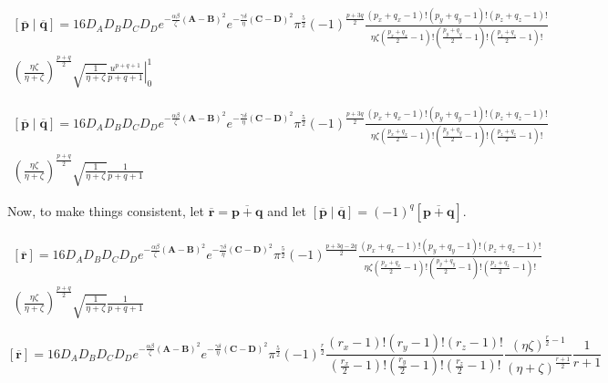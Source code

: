 \begin{multline}
  \left[\overline{\mathbf{p}}\middle|\overline{\mathbf{q}}\right] = 16D_AD_BD_CD_D e^{-\frac{\alpha\beta}{\zeta}\left(\mathbf{A} - \mathbf{B}\right)^2}e^{-\frac{\gamma\delta}{\eta}\left(\mathbf{C} - \mathbf{D}\right)^2}\pi^{\frac{5}{2}}(-1)^{\frac{p + 3q}{2}}\frac{(p_x + q_x - 1)!(p_y + q_y - 1)!(p_z + q_z - 1)!}{\eta\zeta\left(\frac{p_x + q_x}{2} - 1\right)!\left(\frac{p_y + q_y}{2} - 1\right)!\left(\frac{p_z + q_z}{2} - 1\right)!}\\
  \left(\frac{\eta\zeta}{\eta + \zeta}\right)^{\frac{p + q}{2}}\sqrt{\frac{1}{\eta + \zeta}}\left.\frac{u^{p + q + 1}}{p + q + 1}\right|_0^1
\end{multline}

\begin{multline}
  \left[\overline{\mathbf{p}}\middle|\overline{\mathbf{q}}\right] = 16D_AD_BD_CD_D e^{-\frac{\alpha\beta}{\zeta}\left(\mathbf{A} - \mathbf{B}\right)^2}e^{-\frac{\gamma\delta}{\eta}\left(\mathbf{C} - \mathbf{D}\right)^2}\pi^{\frac{5}{2}}(-1)^{\frac{p + 3q}{2}}\frac{(p_x + q_x - 1)!(p_y + q_y - 1)!(p_z + q_z - 1)!}{\eta\zeta\left(\frac{p_x + q_x}{2} - 1\right)!\left(\frac{p_y + q_y}{2} - 1\right)!\left(\frac{p_z + q_z}{2} - 1\right)!}\\
  \left(\frac{\eta\zeta}{\eta + \zeta}\right)^{\frac{p + q}{2}}\sqrt{\frac{1}{\eta + \zeta}}\frac{1}{p + q + 1}
\end{multline}

Now, to make things consistent, let $\overline{\mathbf{r}} = \overline{\mathbf{p} + \mathbf{q}}$ and let $\left[\overline{\mathbf{p}}\middle|\overline{\mathbf{q}}\right] = (-1)^q\left[\overline{\mathbf{p} + \mathbf{q}}\right]$. 

\begin{multline}
  \left[\overline{\mathbf{r}}\right] = 16D_AD_BD_CD_D e^{-\frac{\alpha\beta}{\zeta}\left(\mathbf{A} - \mathbf{B}\right)^2}e^{-\frac{\gamma\delta}{\eta}\left(\mathbf{C} - \mathbf{D}\right)^2}\pi^{\frac{5}{2}}(-1)^{\frac{p + 3q - 2q}{2}}\frac{(p_x + q_x - 1)!(p_y + q_y - 1)!(p_z + q_z - 1)!}{\eta\zeta\left(\frac{p_x + q_x}{2} - 1\right)!\left(\frac{p_y + q_y}{2} - 1\right)!\left(\frac{p_z + q_z}{2} - 1\right)!}\\
  \left(\frac{\eta\zeta}{\eta + \zeta}\right)^{\frac{p + q}{2}}\sqrt{\frac{1}{\eta + \zeta}}\frac{1}{p + q + 1}
\end{multline}

\begin{equation}
  \left[\overline{\mathbf{r}}\right] = 16D_AD_BD_CD_D e^{-\frac{\alpha\beta}{\zeta}\left(\mathbf{A} - \mathbf{B}\right)^2}e^{-\frac{\gamma\delta}{\eta}\left(\mathbf{C} - \mathbf{D}\right)^2}\pi^{\frac{5}{2}}(-1)^{\frac{r}{2}}\frac{(r_x - 1)!(r_y - 1)!(r_z - 1)!}{\left(\frac{r_x}{2} - 1\right)!\left(\frac{r_y}{2} - 1\right)!\left(\frac{r_z}{2} - 1\right)!}\frac{\left(\eta\zeta\right)^{\frac{r}{2} - 1}}{\left(\eta + \zeta\right)^{\frac{r + 1}{2}}}\frac{1}{r + 1}
\end{equation}
